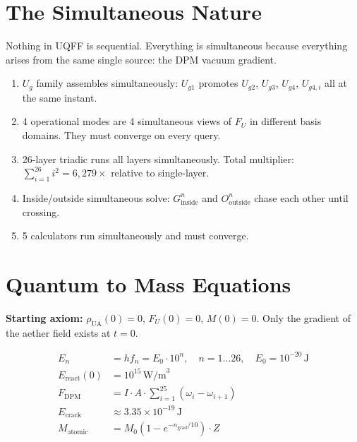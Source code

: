 \documentclass[12pt,a4paper]{article}
\begin{document}
\section{The Simultaneous Nature}
\label{sec:simultaneous}

Nothing in UQFF is sequential.  Everything is simultaneous because everything
arises from the same single source: the DPM vacuum gradient.

\begin{enumerate}[noitemsep]
  \item $U_g$ family assembles simultaneously: $U_{g1}$ promotes $U_{g2}$, $U_{g3}$,
    $U_{g4}$, $U_{g4,i}$ all at the same instant.
  \item 4 operational modes are 4 simultaneous views of $F_U$ in different basis
    domains.  They must converge on every query.
  \item 26-layer triadic runs all layers simultaneously.
    Total multiplier: $\sum_{i=1}^{26}i^2 = 6{,}279\times$ relative to single-layer.
  \item Inside/outside simultaneous solve: $G^n_{\text{inside}}$ and
    $O^n_{\text{outside}}$ chase each other until crossing.
  \item 5 calculators run simultaneously and must converge.
\end{enumerate}

\section{Quantum to Mass Equations}
\label{sec:quantum_mass}

\noindent\textbf{Starting axiom:}
$\rho_\text{UA}(0) = 0$, $F_U(0) = 0$, $M(0) = 0$.
Only the gradient of the aether field exists at $t=0$.

\begin{align}
  E_n &= h f_n = E_0 \cdot 10^n, \quad n=1\ldots26, \quad E_0=10^{-20}\,\text{J}
    \label{eq:energy_levels}\\
  E_{\text{react}}(0) &= 10^{15}\,\text{W/m}^3 \label{eq:ereact0}\\
  F_{\text{DPM}} &= I \cdot A \cdot \sum_{i=1}^{25}(\omega_i - \omega_{i+1})
    \label{eq:dpm_qm}\\
  E_{\text{crack}} &\approx 3.35\times10^{-19}\,\text{J} \label{eq:ecrack2}\\
  M_{\text{atomic}} &= M_0(1 - e^{-n_{\text{grad}}/10})\cdot Z \label{eq:mass2}
\end{align}
\end{document}
